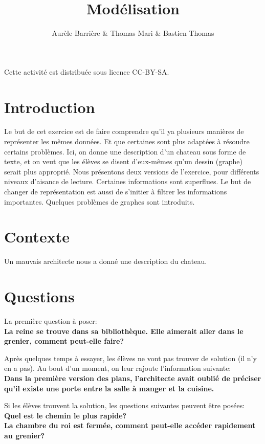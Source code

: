 \documentclass{article}
\title{Modélisation}
\author{Aurèle Barrière \& Thomas Mari \& Bastien Thomas}
\date{}
\begin{document}
\maketitle

Cette activité est distribuée sous licence CC-BY-SA.

\section{Introduction}
Le but de cet exercice est de faire comprendre qu'il ya plusieurs manières de représenter les mêmes données.
Et que certaines sont plus adaptées à résoudre certains problèmes.
Ici, on donne une description d'un chateau sous forme de texte, et on veut que les élèves se disent d'eux-mêmes qu'un dessin (graphe) serait plus approprié.
Nous présentons deux versions de l'exercice, pour différents niveaux d'aisance de lecture.
Certaines informations sont superflues. Le but de changer de représentation est aussi de s'initier à filtrer les informations importantes.
Quelques problèmes de graphes sont introduits.

\section{Contexte}
Un mauvais architecte nous a donné une description du chateau.

\section{Questions}
La première question à poser:\\
\textbf{La reine se trouve dans sa bibliothèque. Elle aimerait aller dans le grenier, comment peut-elle faire?}

Après quelques temps à essayer, les élèves ne vont pas trouver de solution (il n'y en a pas).
Au bout d'un moment, on leur rajoute l'information suivante:\\
\textbf{Dans la première version des plans, l'architecte avait oublié de préciser qu'il existe une porte entre la salle à manger et la cuisine.}

Si les élèves trouvent la solution, les questions suivantes peuvent être posées:\\
\textbf{Quel est le chemin le plus rapide?}\\
\textbf{La chambre du roi est fermée, comment peut-elle accéder rapidement au grenier?}
\end{document}
